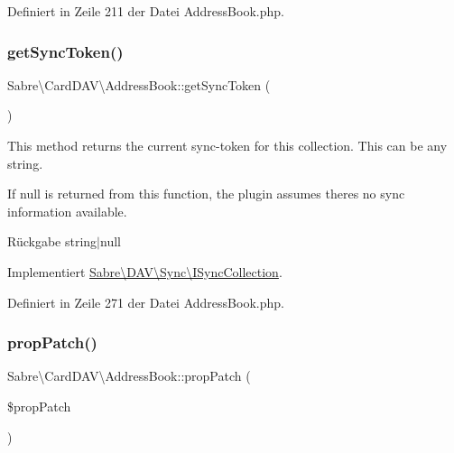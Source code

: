 Definiert in Zeile 211 der Datei Address\+Book.\+php.

\mbox{\label{class_sabre_1_1_card_d_a_v_1_1_address_book_a64df90dc7a77af4028d9eb8ce6be0ffb}} 
\subsubsection{\texorpdfstring{get\+Sync\+Token()}{getSyncToken()}}
{\footnotesize\ttfamily Sabre\textbackslash{}\+Card\+D\+A\+V\textbackslash{}\+Address\+Book\+::get\+Sync\+Token (\begin{DoxyParamCaption}{ }\end{DoxyParamCaption})}

This method returns the current sync-\/token for this collection. This can be any string.

If null is returned from this function, the plugin assumes there\textquotesingle{}s no sync information available.

\begin{DoxyReturn}{Rückgabe}
string$\vert$null 
\end{DoxyReturn}


Implementiert \mbox{\hyperlink{interface_sabre_1_1_d_a_v_1_1_sync_1_1_i_sync_collection_ae8b002d4a88dc34170f9468b5009e08f}{Sabre\textbackslash{}\+D\+A\+V\textbackslash{}\+Sync\textbackslash{}\+I\+Sync\+Collection}}.



Definiert in Zeile 271 der Datei Address\+Book.\+php.

\mbox{\label{class_sabre_1_1_card_d_a_v_1_1_address_book_a829e6b975824feba36708e77c7167bef}} 
\subsubsection{\texorpdfstring{prop\+Patch()}{propPatch()}}
{\footnotesize\ttfamily Sabre\textbackslash{}\+Card\+D\+A\+V\textbackslash{}\+Address\+Book\+::prop\+Patch (\begin{DoxyParamCaption}\item[{\mbox{\hyperlink{class_sabre_1_1_d_a_v_1_1_prop_patch}{D\+A\+V\textbackslash{}\+Prop\+Patch}}}]{\$prop\+Patch }\end{DoxyParamCaption})}

